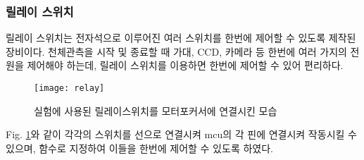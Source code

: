 \subsubsection{릴레이 스위치}

릴레이 스위치는 전자석으로 이루어진 여러 스위치를 한번에 제어할 수 있도록 제작된 장비이다. 천체관측을 시작 및 종료할 때 가대, CCD, 카메라 등 한번에 여러 가지의 전원을 제어해야 하는데, 릴레이 스위치를 이용하면 한번에 제어할 수 있어 편리하다. 

\begin{figure}[h]
	\begin{center}
		\texttt{[image: relay]}
	\end{center}
	\caption{실험에 사용된 릴레이스위치를 모터포커서에 연결시킨 모습}
	\label{relay}
\end{figure}

Fig. \ref{relay}와 같이 각각의 스위치를 선으로 연결시켜 mcu의 각 핀에 연결시켜 작동시킬 수 있으며, 함수로 지정하여 이들을 한번에 제어할 수 있도록 하였다.